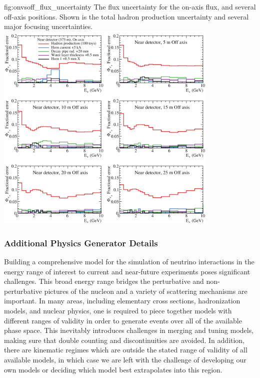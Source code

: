 
\begin{dunefigure}{fig:onvsoff_flux_uncertainty}
{The flux uncertainty for the on-axis flux, and several off-axis positions. Shown is the total hadron production uncertainty and several major focusing uncertainties.}
    \includegraphics[width=0.8\textwidth]{graphics/onaxis_vs_offaxis_uncertainties.png}
\end{dunefigure}

\subsubsection{Additional Physics Generator Details}
\label{sec:tools-app-generator}

Building a comprehensive model for the simulation of neutrino interactions in the energy range of interest to current and near-future experiments poses significant challenges. This broad energy range bridges the perturbative and non-perturbative pictures of the nucleon and a variety of scattering mechanisms are important. In many areas, including elementary cross sections, hadronization models, and nuclear physics, one is required to piece together models with different ranges of validity in order to generate events over all of the available phase space. This inevitably introduces challenges in merging and tuning models, making sure that double counting and discontinuities are avoided. In addition, there are kinematic regimes which are outside the stated range of validity of all available models, in which case we are left with the challenge of developing our own models or deciding which model best extrapolates into this region. 

